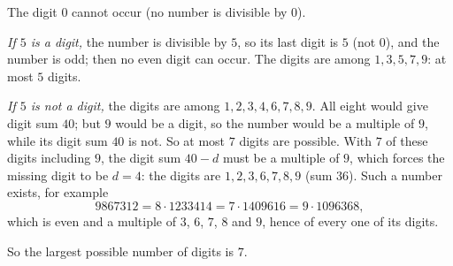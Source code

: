 The digit $0$ cannot occur (no number is divisible by $0$).

\emph{If $5$ is a digit,} the number is divisible by $5$, so its last digit is $5$ (not $0$), and the number is odd; then no even digit can occur. The digits are among $1,3,5,7,9$: at most $5$ digits.

\emph{If $5$ is not a digit,} the digits are among $1,2,3,4,6,7,8,9$. All eight would give digit sum $40$; but $9$ would be a digit, so the number would be a multiple of $9$, while its digit sum $40$ is not. So at most $7$ digits are possible. With $7$ of these digits including $9$, the digit sum $40-d$ must be a multiple of $9$, which forces the missing digit to be $d=4$: the digits are $1,2,3,6,7,8,9$ (sum $36$). Such a number exists, for example
\[
9867312=8\cdot1233414=7\cdot1409616=9\cdot1096368,
\]
which is even and a multiple of $3$, $6$, $7$, $8$ and $9$, hence of every one of its digits.

So the largest possible number of digits is $\boxed{7}$.
